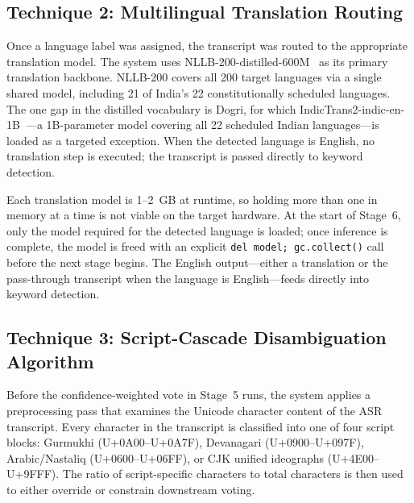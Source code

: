 \documentclass[12pt, onecolumn]{IEEEtran}
\begin{document}
\subsection{Technique 2: Multilingual Translation Routing}

Once a language label was assigned, the transcript was routed to the appropriate translation model. The system uses NLLB-200-distilled-600M~\cite{costajussa2024nllb} as its primary translation backbone. NLLB-200 covers all 200 target languages via a single shared model, including 21 of India's 22 constitutionally scheduled languages. The one gap in the distilled vocabulary is Dogri, for which IndicTrans2-indic-en-1B~\cite{gala2023indictrans2}---a 1B-parameter model covering all 22 scheduled Indian languages---is loaded as a targeted exception. When the detected language is English, no translation step is executed; the transcript is passed directly to keyword detection.

Each translation model is 1--2~GB at runtime, so holding more than one in memory at a time is not viable on the target hardware. At the start of Stage~6, only the model required for the detected language is loaded; once inference is complete, the model is freed with an explicit \texttt{del model; gc.collect()} call before the next stage begins. The English output---either a translation or the pass-through transcript when the language is English---feeds directly into keyword detection.

\subsection{Technique 3: Script-Cascade Disambiguation Algorithm}

Before the confidence-weighted vote in Stage~5 runs, the system applies a preprocessing pass that examines the Unicode character content of the ASR transcript. Every character in the transcript is classified into one of four script blocks: Gurmukhi (U+0A00--U+0A7F), Devanagari (U+0900--U+097F), Arabic/Nastaliq (U+0600--U+06FF), or CJK unified ideographs (U+4E00--U+9FFF). The ratio of script-specific characters to total characters is then used to either override or constrain downstream voting.
\end{document}
